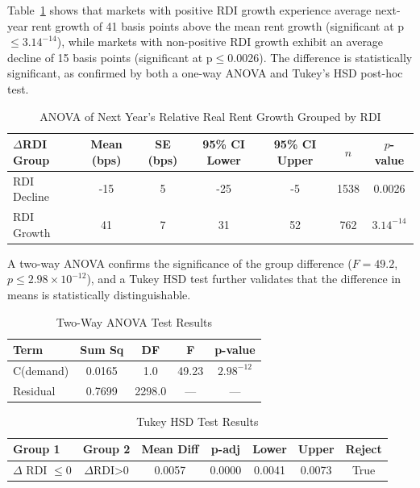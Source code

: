 \documentclass[APA,Times1COL]{WileyNJDv5} %
\begin{document}
Table~\ref{tab:anova-results} shows that markets with positive RDI growth experience average next-year rent growth of 41 basis points above the mean rent growth (significant at p$\leq 3.14^{-14}$), while markets with non-positive RDI growth exhibit an average decline of 15 basis points (significant at p$\leq$0.0026). The difference is statistically significant, as confirmed by both a one-way ANOVA and Tukey’s HSD post-hoc test.

\begin{table}[h]
	\centering
	\caption{ANOVA of Next Year's Relative Real Rent Growth Grouped by RDI}
	\label{tab:anova-results}
	\begin{tabular}{lcccccc} \toprule
		$\Delta$RDI Group & Mean (bps) & SE (bps) & 95\% CI Lower & 95\% CI Upper & $n$ & $p$-value \\ \midrule
		RDI Decline & -15 & 5 & -25 & -5 & 1538 & 0.0026 \\
		RDI Growth & 41 & 7 & 31 & 52 & 762 & $3.14^{-14}$ \\
		\bottomrule
	\end{tabular}
\end{table}

A two-way ANOVA confirms the significance of the group difference ($F = 49.2$, $p \leq 2.98 \times 10^{-12}$), and a Tukey HSD test further validates that the difference in means is statistically distinguishable.
\begin{table}[h]
	\centering
	\caption{Two-Way ANOVA Test Results}
	\label{tab:two-way-anova}
	\begin{tabular}{lcccc} \toprule
		Term & Sum Sq & DF & F & p-value \\ \midrule
		C(demand) & 0.0165 & 1.0 & 49.23 &  $2.98^{-12}$\\
		Residual & 0.7699 & 2298.0 & --- & --- \\
		\bottomrule
	\end{tabular}
\end{table}

\begin{table}[h]
	\centering
	\caption{Tukey HSD Test Results}
	\label{tab:tukey}
	
	\begin{tabular}{lcccccc} \toprule
		Group 1 & Group 2 & Mean Diff & p-adj & Lower & Upper & Reject \\ \midrule
		$\Delta$ RDI $\leq$0 & $\Delta$RDI>0 & 0.0057 & 0.0000 & 0.0041 & 0.0073 & True \\
		\bottomrule
	\end{tabular}
\end{table}
\end{document}
